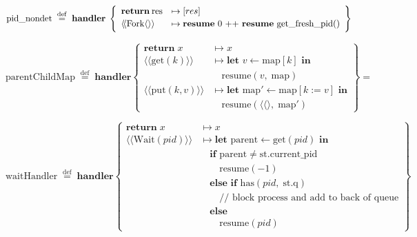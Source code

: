 \documentclass[logo,bsc,singlespacing,parskip]{infthesis}
\begin{document}
\[
\mathrm{pid\_nondet} \;\overset{\mathrm{def}}{=}\;
\textbf{handler} \;\left\{
\begin{array}{ll}
  \mathrm{\textbf{return}\:res} & \mapsto [res] \quad\\[0.5ex]
  \langle\!\langle \mathrm{Fork} \langle\rangle\rangle &  \mapsto \textbf{resume} \text{ 0 ++ \textbf{resume} get\_fresh\_pid()}     \quad\\[0.5ex]
  
\end{array}
\right\}
\]

\[
\mathrm{parentChildMap} \;\overset{\mathrm{def}}{=}\; \textbf{handler}
\left\{
\begin{array}{ll}
\mathbf{return}\; x 
  & \mapsto x \\[1ex]

\langle\!\langle \mathrm{get}(k) \rangle\!\rangle 
  & \mapsto \textbf{let } v \leftarrow \mathrm{map}[k] \textbf{ in} \\
  & \quad \mathrm{resume}(v,\; \mathrm{map}) \\[1ex]

\langle\!\langle \mathrm{put}(k, v) \rangle\!\rangle 
  & \mapsto \textbf{let } \mathrm{map'} \leftarrow \mathrm{map}[k := v] \textbf{ in} \\
  & \quad \mathrm{resume}(\langle\langle\rangle,\; \mathrm{map'})
\end{array}
\right\}
=\]


\[
\mathrm{waitHandler} \;\overset{\mathrm{def}}{=}\; \textbf{handler}
\left\{
\begin{array}{ll}
\mathbf{return}\; x 
  & \mapsto x \\[1ex]

\langle\!\langle \mathrm{Wait}(pid) \rangle\!\rangle 
  & \mapsto \textbf{let } \mathrm{parent} \leftarrow \mathrm{get}(pid) \textbf{ in} \\
  & \quad \textbf{if } \mathrm{parent} \neq \mathrm{st.current\_pid} \\ & \quad\quad  \mathrm{resume}(-1) \\[0.5ex]
  & \quad \textbf{else if } \mathrm{has}(pid,\; \mathrm{st.q})  \\
  & \quad\quad \text{// block process and add to back of queue} \\
  & \quad \textbf{else } \\ & \quad\quad \mathrm{resume}(pid)
\end{array}
\right\}
\]
\end{document}
